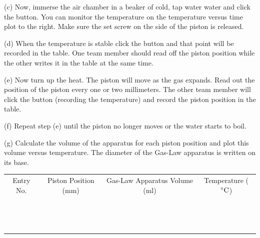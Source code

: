 
(c) Now, immerse the air chamber in a beaker of cold, tap water water and click
the  button. You can monitor the temperature
on the temperature versus time plot to the right.
Make sure the set screw on the side of the piston is released.

(d) When the temperature is stable click the  button and that point will be recorded in the
table. One team member should read off the piston position while the other 
writes it in the table at the same time.

(e) Now turn up the heat. The piston will move as the gas expands.
Read out the position of the piston every one or two millimeters. The other team member
will click the  button (recording the temperature) and record the piston position
in the table.

(f) Repeat step (e) until the piston no longer moves or the water starts to boil.
 
(g) Calculate the volume of the apparatus for each piston position and plot
this volume versus temperature. The diameter of the Gas-Law apparatus is written on its
base.

\vspace{0.3cm}
\begin{center}
{\renewcommand{\arraystretch}{1.1}
\begin{tabular}{|c|c|c|c|}
\hline 
Entry No.&
Piston Position (mm)&
Gas-Law Apparatus Volume (ml)&
Temperature ($^\circ  \rm C$)\\
\hhline{|=|=|=|=|}
& & & \\
\hline 
& & & \\
\hline 
& & & \\
\hline 
& & & \\
\hline 
& & & \\
\hline 
& & & \\
\hline 
& & & \\
\hline 
& & & \\
\hline 
& & & \\
\hline 
& & & \\
\hline 
& & & \\
\hline 
& & & \\
\hline 
& & & \\
\hline 
& & & \\
\hline 
\end{tabular}\par}
\end{center}
\vspace{0.3cm}

